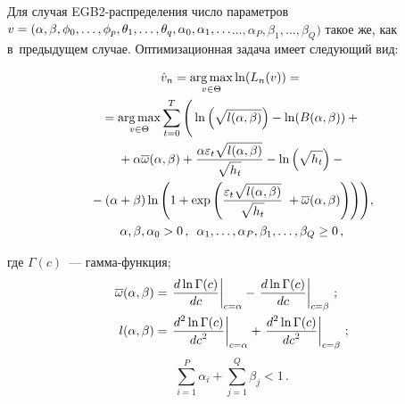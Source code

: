 \begin{multicols}{2}
  Для случая EGB2-распределения число па\-ра\-мет\-ров $v\hm= (\alpha, \beta, 
\phi_0, \ldots , \phi_p, \theta_1, \ldots , \theta_q, \alpha_0, \alpha_1, \ldots$\linebreak $\ldots , \alpha_P, 
\beta_1, \ldots , \beta_Q)$ такое же, как в~предыдущем случае. 
Оптимизационная задача имеет следующий вид:

\vspace*{-6pt}

\noindent
  \begin{multline}
  \hat{v}_n=\argmax\limits_{v\in \Theta} \ln (L_n(v))={}\\
  {}=\argmax\limits_{v\in \Theta} \sum\limits^T_{t=0} \left( 
  \vphantom{\fr{\varepsilon_t\sqrt{l(\alpha,\beta)}}{\sqrt{h_t}}}
  \ln \left( \sqrt{l(\alpha,\beta)}\right) -
\ln(B(\alpha,\beta)) +{}\right.\\
{}+ \alpha\overline{\omega}(\alpha,\beta)+ 
\fr{\alpha\varepsilon_t\sqrt{l(\alpha,\beta)}}{\sqrt{h_t}}
- \ln\left(\sqrt{h_t}\right)-{}\\
{} -(\alpha+\beta) \ln \left( 1+\exp \left( 
\fr{\varepsilon_t\sqrt{l(\alpha,\beta)}}{\sqrt{h_t}}
\left.{}+\overline{\omega}(\alpha,\beta)
 \vphantom{\fr{\varepsilon_t\sqrt{l(\alpha,\beta)}}{\sqrt{h_t}}}
 \right)\right)\right)\!,\\
  \alpha,\beta,\alpha_0>0\,, \enskip \alpha_1,\ldots, \alpha_P,\beta_1,\ldots , \beta_Q\geq 0\,,
  \label{e9-dan}
  \end{multline}
\vspace*{-6pt}
  
\noindent
где $\Gamma(c)$~--- гамма-функция;
\begin{align*}
\overline{\omega}(\alpha,\beta)&=\left.\displaystyle\frac{\displaystyle d\ln\Gamma(c)\mathstrut}{\displaystyle dc\mathstrut}\right\vert_{c=\alpha}-
\left.\displaystyle\frac{\displaystyle d\ln\Gamma(c)\mathstrut}{\displaystyle dc\mathstrut}\right\vert_{c=\beta}\,;\\
l(\alpha,\beta)&=\left.\displaystyle\frac{\displaystyle d^2\ln\Gamma(c)\mathstrut}{\displaystyle dc^2\mathstrut}\right\vert_{c=\alpha} +
\left.\displaystyle\frac{\displaystyle d^2\ln\Gamma(c)\mathstrut}{\displaystyle dc^2\mathstrut}\right\vert_{c=\beta}\,;
\end{align*}
$$
\sum\limits^P_{i=1}\alpha_i+\sum\limits^Q_{j=1} \beta_j<1\,.
$$
  
\begin{figure*}[b] %
\vspace*{1pt}
    \begin{center}  
  \mbox{%
 \epsfxsize=162.997mm 
 }
\end{center}
\vspace*{-12pt}
\vspace*{5pt}
    \begin{center}  
  \mbox{%
 \epsfxsize=162.997mm 
 }
\end{center}
   \vspace*{-12pt}
  \end{figure*}


\end{multicols}
